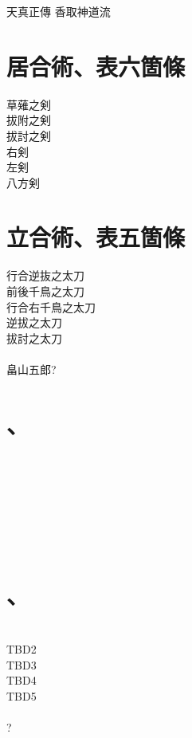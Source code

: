 \documentclass[dvipdfmx, a4paper, 12pt]{utarticle}
\begin{document}
\begin{CJK*}{UTF8}{min}
\CJKtilde
\begin{landscape}

\newpage
\pagestyle{empty}
天真正傳
香取神道流
\section{居合術、表六箇條}
\noindent 草薙之剣\\
拔附之剣\\
拔討之剣\\
右剣\\
左剣\\
八方剣\\
\section{立合術、表五箇條}
\noindent 行合逆抜之太刀\\
前後千鳥之太刀\\
行合右千鳥之太刀\\
逆拔之太刀\\
拔討之太刀\\
\\
畠山五郎?

\setcounter{section}{0}
\newpage
\pagestyle{empty}
\section{、}
\noindent {}\\
\\
\\
\\
\\
\\
\section{、}
\noindent {}\\
TBD2\\
TBD3\\
TBD4\\
TBD5\\
\\
?\\


\end{landscape}
\end{CJK*}
\end{document}
